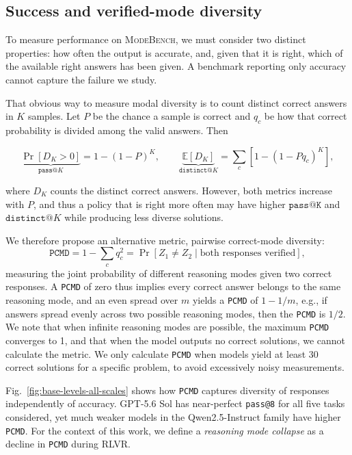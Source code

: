 \documentclass{article}
\newcommand{\1}{\mathbf 1}
\newcommand{\E}{\mathbb E}
\newcommand{\mb}{\textsc{ModeBench}}
\newcommand{\pmd}{\texttt{PCMD}}
\theoremstyle{remark}
\theoremstyle{definition}
\theoremstyle{plain}
\begin{document}
\subsection{Success and verified-mode diversity}
\label{sec:collapse-metrics}

To measure performance on \mb{}, we must consider two distinct properties: how often the output is accurate, and, given that it is right, which of the available right answers has been given.
A benchmark reporting only accuracy cannot capture the failure we study.

That obvious way to measure modal diversity is to count distinct correct answers in $K$ samples. Let $P$ be the chance a sample is correct and $q_c$ be how that correct probability is divided among the valid answers.
Then

\begin{equation}
 \underbrace{\Pr[D_K>0]}_{\texttt{pass@}K}=1-(1-P)^K,
 \qquad
 \underbrace{\E[D_K]}_{\texttt{distinct@}K}
 =\sum_c[1-(1-Pq_c)^K],
 \label{eq:main-occupancy}
\end{equation}

where $D_K$ counts the distinct correct answers. However, both metrics increase with $P$, and thus a policy that is right more often may have higher $\texttt{pass@K}$ and $\texttt{distinct@}K$ while producing less diverse solutions.

We therefore propose an alternative metric, pairwise correct-mode diversity:
\begin{equation}
 \pmd = 1-\sum_c q_c^2
 = \Pr[Z_1\ne Z_2\mid \text{both responses verified}],
 \label{eq:main-pmd}
\end{equation}
measuring the joint probability of different reasoning modes given two correct responses. A \pmd{} of zero thus implies every correct answer belongs to the same reasoning mode, and an even spread over $m$ yields a \pmd{} of $1-1/m$, e.g., if answers spread evenly across two possible reasoning modes, then the \pmd{} is $1/2$. We note that when infinite reasoning modes are possible, the maximum \pmd{} converges to 1, and that when the model outputs no correct solutions, we cannot calculate the metric. We only calculate \pmd{} when models yield at least 30 correct solutions for a specific problem, to avoid excessively noisy measurements.

Fig.~\ref{fig:base-levels-all-scales} shows how \pmd{} captures diversity of responses independently of accuracy. GPT-5.6 Sol has near-perfect \texttt{pass@8} for all five tasks considered, yet much weaker models in the Qwen2.5-Instruct family have higher \pmd{}.
For the context of this work, we define a \textit{reasoning mode collapse} as a decline in \pmd{} during RLVR.
\end{document}
